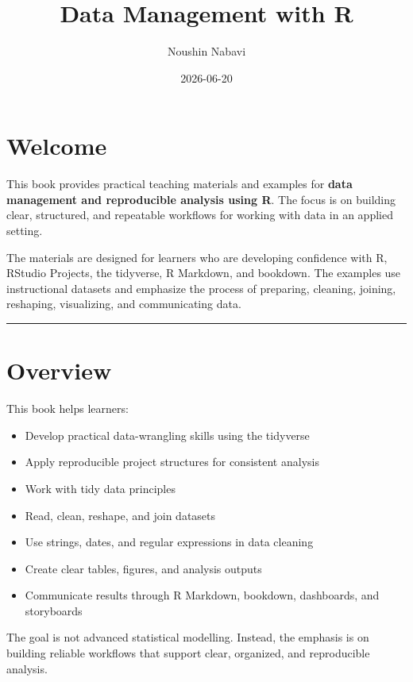 \documentclass[
  11pt,
  oneside]{book}
\title{Data Management with R}
\author{Noushin Nabavi}
\date{2026-06-20}
\providecommand{\tightlist}{%
  \setlength{\itemsep}{0pt}\setlength{\parskip}{0pt}}
\begin{document}
\maketitle

{
\setcounter{tocdepth}{1}
\tableofcontents
}
\chapter*{Welcome}\label{welcome}

This book provides practical teaching materials and examples for \textbf{data management and reproducible analysis using R}. The focus is on building clear, structured, and repeatable workflows for working with data in an applied setting.

The materials are designed for learners who are developing confidence with R, RStudio Projects, the tidyverse, R Markdown, and bookdown. The examples use instructional datasets and emphasize the process of preparing, cleaning, joining, reshaping, visualizing, and communicating data.

\begin{center}\rule{0.5\linewidth}{0.5pt}\end{center}

\chapter*{Overview}\label{overview}

This book helps learners:

\begin{itemize}
\tightlist
\item
  Develop practical data-wrangling skills using the tidyverse
\item
  Apply reproducible project structures for consistent analysis
\item
  Work with tidy data principles
\item
  Read, clean, reshape, and join datasets
\item
  Use strings, dates, and regular expressions in data cleaning
\item
  Create clear tables, figures, and analysis outputs
\item
  Communicate results through R Markdown, bookdown, dashboards, and storyboards
\end{itemize}

The goal is not advanced statistical modelling. Instead, the emphasis is on building reliable workflows that support clear, organized, and reproducible analysis.
\end{document}
